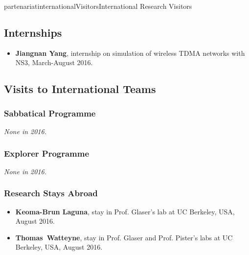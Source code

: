 \documentclass{ra2016}
\newcommand{\thomas}           {\textbf{Thomas~Watteyne}}
\begin{document}
\begin{module}{partenariat}{internationalVisitors}{International Research Visitors}
\subsection{Internships}

\begin{itemize}
    \item{\bf Jiangnan Yang}, internship on simulation of wireless TDMA networks with NS3, March-August 2016.
\end{itemize}

\subsection{Visits to International Teams}


\subsubsection{Sabbatical Programme}

\textit{None in 2016.}

\subsubsection{Explorer Programme}

\textit{None in 2016.}

\subsubsection{Research Stays Abroad}


\begin{itemize}
    \item{\bf Keoma-Brun Laguna}, stay in Prof. Glaser's lab at UC Berkeley, USA, August 2016.
    \item{\bf \thomas}, stay in Prof. Glaser and Prof. Pister's labs at UC Berkeley, USA, August 2016.
\end{itemize}

\end{module}
\end{document}
